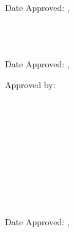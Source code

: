 \begin{titlepage}
\begin{singlespacing}
\begin{minipage}[b]{0.4\textwidth}
	\committeeMemberSix\\
	\committeeMemberSixDepartment\\
	\textit{\committeeMemberSixAffiliation}\\
	
	Date Approved: \approvalMonth{} \approvalDay, \approvalYear
	\vspace{1\baselineskip}		%
	
	\else
	
	\committeeMemberFive\\
	\committeeMemberFiveDepartment\\
	\textit{\committeeMemberFiveAffiliation}\\
		
	Date Approved: \approvalMonth{} \approvalDay, \approvalYear
	\vspace{5\baselineskip}		%
	
	\fi
	
\end{minipage}

\else

\hspace{0.6\textwidth}
\begin{minipage}[b]{0.4\textwidth}
	
	Approved by:
	\vspace{2\baselineskip}		%
	
	\committeeMemberOne\\
	\committeeMemberOneDepartment\\
	\textit{\committeeMemberOneAffiliation}\\
	
	\committeeMemberTwo\\
	\committeeMemberTwoDepartment\\
	\textit{\committeeMemberTwoAffiliation}\\
	
	\committeeMemberThree\\
	\committeeMemberThreeDepartment\\
	\textit{\committeeMemberThreeAffiliation}\\
	
	\vspace{2\baselineskip}		%
	
	Date Approved: \approvalMonth{} \approvalDay, \approvalYear
	\vspace{\baselineskip}		%
	
\end{minipage}

\fi





\end{singlespacing}
\end{titlepage}
